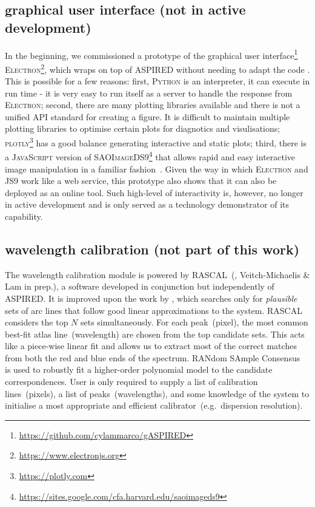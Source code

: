 \documentclass[fleqn,usenatbib]{mnras}
\begin{document}
\subsection*{graphical user interface (not in active development)}
In the beginning, we commissioned a prototype of the graphical user
interface\footnote{\url{https://github.com/cylammarco/gASPIRED}}
\textsc{Electron}\footnote{\url{https://www.electronjs.org}}, which wraps on top of
\textsc{ASPIRED} without needing to adapt the code . This is
possible for a few reasons: first, \textsc{Python} is an interpreter, it can execute
in run time - it is very easy to run itself as a server to handle the response from 
\textsc{Electron}; second, there are many plotting libraries available and there is
not a unified API standard for creating a figure. It is difficult to maintain
multiple plotting libraries to optimise certain plots for diagnotics and
visulisations; \textsc{plotly}\footnote{\url{https://plotly.com}} has a good balance
generating interactive and static plots; third, there is a \textsc{JavaScript} version of
\textsc{SAOImageDS9}\footnote{\url{https://sites.google.com/cfa.harvard.edu/saoimageds9}}
that allows rapid and easy interactive image manipulation in a familiar
fashion~\citep{eric_mandel_2021_596052}. Given the way in which \textsc{Electron} and
\textsc{JS9} work like a web service, this prototype also shows that it can also
be deployed as an online tool. Such high-level of interactivity is, however, no longer
in active development and is only served as a technology demonstrator of its capability.

\subsection*{wavelength calibration (not part of this work)}
The wavelength calibration module is powered by
\textsc{RASCAL}~(\citealt{2020zndo...4117517V, 2020ASPC..527..627V}, Veitch-Michaelis
\& Lam in prep.), a software developed in conjunction but independently of \textsc{ASPIRED}.
It is improved upon the work by \citet{2018ApOpt..57.6876S}, which searches only for
\textit{plausible} sets of arc lines that follow good linear approximations to the
system. \textsc{RASCAL} considers the top $N$ sets simultaneously. For each peak~(pixel),
the most common best-fit atlas line~(wavelength) are chosen from the top candidate
sets. This acts like a piece-wise linear fit and allows us to extract most of
the correct matches from both the red and blue ends of the spectrum. RANdom
SAmple Consensus~\citep[RANSAC,][]{fischler_bolles_1981} is used to robustly
fit a higher-order polynomial model to the candidate correspondences. User
is only required to supply a list of calibration lines~(pixels), a
list of peaks~(wavelengths), and some knowledge of the system to initialise a
most appropriate and efficient calibrator~(e.g.\ dispersion resolution).
\end{document}
